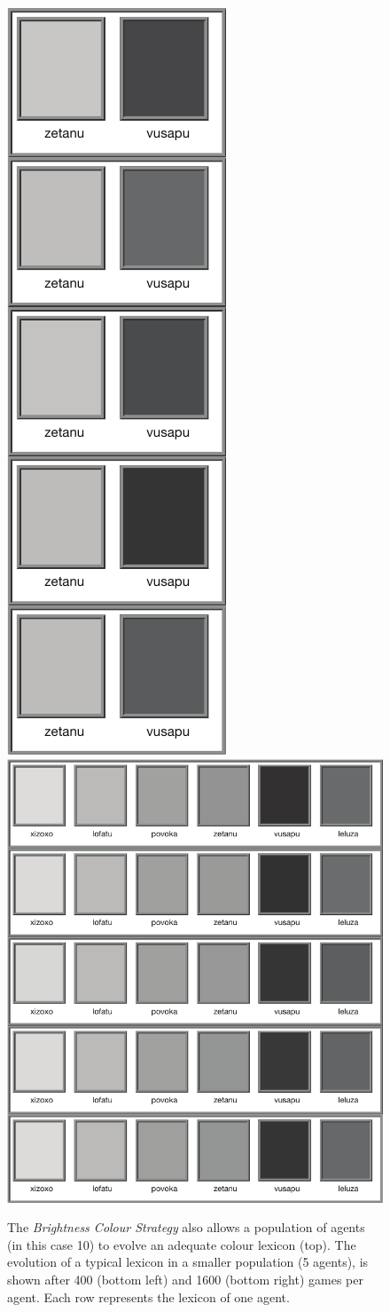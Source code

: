 \begin{figure}[p]
\centerline{
\includegraphics[height=0.5\textwidth]{chap12/figs/bw-1000.pdf} $~~~$
\includegraphics[height=0.5\textwidth]{chap12/figs/bw-4000.pdf}}
\label{fig:brightness-dynamics}
\caption{{The {\itshape Brightness Colour Strategy} also allows a population of agents (in this case 10)
to evolve an adequate colour lexicon (top). The evolution of a typical lexicon in a smaller population (5 agents), is shown 
after 400 (bottom left) and 1600 (bottom right) games per agent. Each row represents
the lexicon of one agent.}}
\end{figure}

